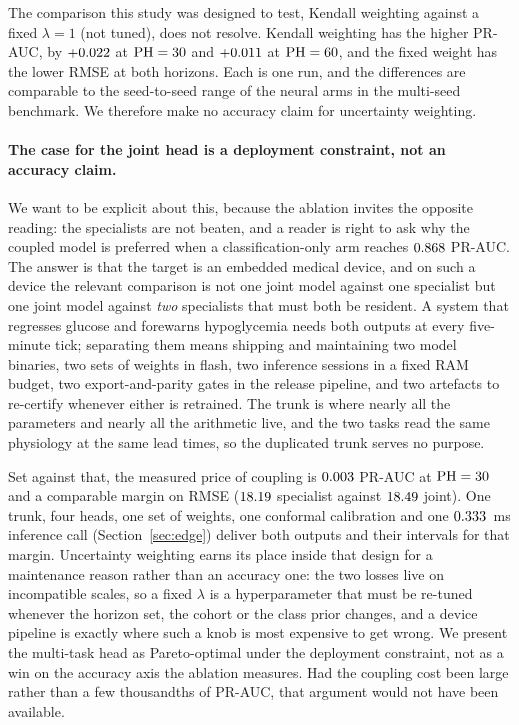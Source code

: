 The comparison this study was designed to test, Kendall weighting against a fixed
$\lambda = 1$ (not tuned), does not resolve. Kendall weighting has the higher
PR-AUC, by $+0.022$ at $\mathrm{PH} = 30$ and
$+0.011$ at $\mathrm{PH} = 60$, and the fixed weight has the lower
RMSE at both horizons. Each is one run, and the differences are comparable to
the seed-to-seed range of the neural arms in the multi-seed benchmark. We therefore make
no accuracy claim for uncertainty weighting.

\paragraph{The case for the joint head is a deployment constraint, not an
accuracy claim.} We want to be explicit about this, because the ablation invites
the opposite reading: the specialists are not beaten, and a reader is right to
ask why the coupled model is preferred when a classification-only arm reaches
$0.868$ PR-AUC. The answer is that the target is an embedded
medical device, and on such a device the relevant comparison is not one joint
model against one specialist but one joint model against \emph{two} specialists
that must both be resident. A system that regresses glucose and forewarns
hypoglycemia needs both outputs at every five-minute tick; separating them means
shipping and maintaining two model binaries, two sets of weights in flash, two
inference sessions in a fixed RAM budget, two export-and-parity gates in the
release pipeline, and two artefacts to re-certify whenever either is retrained.
The trunk is where nearly all the parameters and nearly all the arithmetic live,
and the two tasks read the same physiology at the same lead times, so the
duplicated trunk serves no purpose.

Set against that, the measured price of coupling is
$0.003$ PR-AUC at $\mathrm{PH} = 30$ and a comparable margin on
RMSE ($18.19$ specialist against
$18.49$ joint). One trunk, four heads, one set of weights,
one conformal calibration and one $0.333$~ms inference call
(Section~\ref{sec:edge}) deliver both outputs and their intervals for that
margin. Uncertainty weighting earns its place inside that design for a
maintenance reason rather than an accuracy one: the two losses live on
incompatible scales, so a fixed $\lambda$ is a hyperparameter that must be
re-tuned whenever the horizon set, the cohort or the class prior changes, and a
device pipeline is exactly where such a knob is most expensive to get wrong. We
present the multi-task head as Pareto-optimal under the deployment constraint,
not as a win on the accuracy axis the ablation measures. Had the coupling cost
been large rather than a few thousandths of PR-AUC, that argument would not have
been available.

